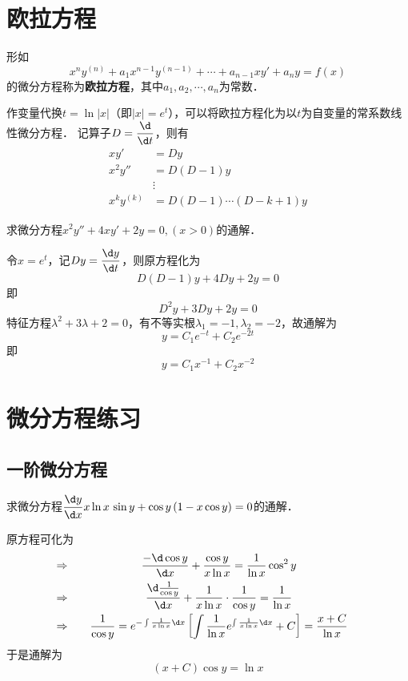 \documentclass[12pt, a4paper, oneside, UTF8]{ctexbook}
\begin{document}
\section{欧拉方程}
\begin{definition}
    形如
    \[x^n y^{(n)} + a_1 x^{n-1} y^{(n-1)} + \cdots + a_{n-1} x y' + a_n y = f(x)\]
    的微分方程称为\textbf{欧拉方程}，其中$a_1, a_2, \cdots, a_n$为常数．
\end{definition}
\begin{theorem}
    作变量代换$t=\ln|x|$（即$|x|=e^t$），可以将欧拉方程化为以$t$为自变量的常系数线性微分方程．
    记算子$D=\dfrac{\d}{\d t}$，则有
    \[
    \begin{aligned}
        x y' &= D y \\
        x^2 y'' &= D(D-1) y \\
        &\vdots \\
        x^k y^{(k)} &= D(D-1)\cdots(D-k+1) y
    \end{aligned}
    \]
\end{theorem}
\begin{example}
    求微分方程$x^2 y'' + 4x y' + 2y = 0,(x>0)$的通解．
\end{example}
\begin{solution}
    令$x=e^{t}$，记$Dy=\dfrac{\d y}{\d t}$，则原方程化为
    \[D(D-1)y+4Dy+2y=0\]
    即
    \[D^2y + 3Dy + 2y=0\]
    特征方程$\lambda^2 + 3\lambda + 2 = 0$，有不等实根$\lambda_1 = -1, \lambda_2 = -2$，故通解为
    \[y = C_1 e^{-t} + C_2 e^{-2t}\]
    即
    \[\boxed{y = C_1 x^{-1} + C_2 x^{-2}}\]
\end{solution}
\section{微分方程练习}
\subsection{一阶微分方程}
\begin{exercise}
    求微分方程$\dfrac{\d y}{\d x}x\ln x\, \sin y +\cos y\,(1-x\cos y)=0$的通解．
\end{exercise}
\begin{solution}
    原方程可化为
    \[
    \begin{array}{l@{\qquad}c@{\quad}r}
        \Rightarrow & \displaystyle \dfrac{-\d \cos y}{\d x}+\dfrac{\cos y}{x\ln x}=\dfrac{1}{\ln x}\cos^2y & \\[8pt]
        \Rightarrow & \displaystyle \dfrac{\d \frac{1}{\cos y}}{\d x}+\dfrac{1}{x\ln x}\cdot \dfrac{1}{\cos y}=\dfrac{1}{\ln x}&\\[8pt]
        \Rightarrow & \displaystyle \dfrac{1}{\cos y}=e^{-\int \frac{1}{x\ln x}\d x}\left[\int\dfrac{1}{\ln x}e^{\int \frac{1}{x\ln x}\d x}+C\right]=\dfrac{x+C}{\ln x}&
    \end{array}
    \]
    于是通解为
    \[\boxed{(x+C)\cos y=\ln x}\]
\end{solution}
\end{document}
